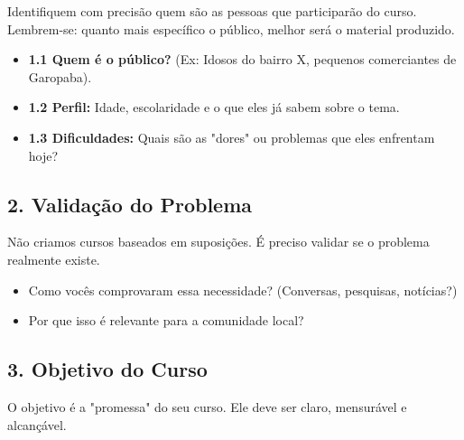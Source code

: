 \documentclass[12pt,a4paper]{article}
\begin{document}
\begin{boxAtividade}[Atividade 01]
Identifiquem com precisão quem são as pessoas que participarão do curso. Lembrem-se: quanto mais específico o público, melhor será o material produzido.

\begin{itemize}
    \item \textbf{1.1 Quem é o público?} (Ex: Idosos do bairro X, pequenos comerciantes de Garopaba).
    \item \textbf{1.2 Perfil:} Idade, escolaridade e o que eles já sabem sobre o tema.
    \item \textbf{1.3 Dificuldades:} Quais são as "dores" ou problemas que eles enfrentam hoje?
\end{itemize}
\end{boxAtividade}

\subsection{2. Validação do Problema}

\begin{boxAtividade}[Atividade 02]
Não criamos cursos baseados em suposições. É preciso validar se o problema realmente existe.
\begin{itemize}
    \item Como vocês comprovaram essa necessidade? (Conversas, pesquisas, notícias?)
    \item Por que isso é relevante para a comunidade local?
\end{itemize}
\end{boxAtividade}

\subsection{3. Objetivo do Curso}

O objetivo é a "promessa" do seu curso. Ele deve ser claro, mensurável e alcançável.
\end{document}
